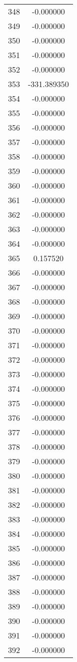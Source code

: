 \documentclass[12pt]{article}
\begin{document}
\begin{longtable}{@{}cc@{}}
348 & -0.000000 \\
349 & -0.000000 \\
350 & -0.000000 \\
351 & -0.000000 \\
352 & -0.000000 \\
353 & -331.389350 \\
354 & -0.000000 \\
355 & -0.000000 \\
356 & -0.000000 \\
357 & -0.000000 \\
358 & -0.000000 \\
359 & -0.000000 \\
360 & -0.000000 \\
361 & -0.000000 \\
362 & -0.000000 \\
363 & -0.000000 \\
364 & -0.000000 \\
365 & 0.157520 \\
366 & -0.000000 \\
367 & -0.000000 \\
368 & -0.000000 \\
369 & -0.000000 \\
370 & -0.000000 \\
371 & -0.000000 \\
372 & -0.000000 \\
373 & -0.000000 \\
374 & -0.000000 \\
375 & -0.000000 \\
376 & -0.000000 \\
377 & -0.000000 \\
378 & -0.000000 \\
379 & -0.000000 \\
380 & -0.000000 \\
381 & -0.000000 \\
382 & -0.000000 \\
383 & -0.000000 \\
384 & -0.000000 \\
385 & -0.000000 \\
386 & -0.000000 \\
387 & -0.000000 \\
388 & -0.000000 \\
389 & -0.000000 \\
390 & -0.000000 \\
391 & -0.000000 \\
392 & -0.000000 \\

\end{longtable}
\end{document}
